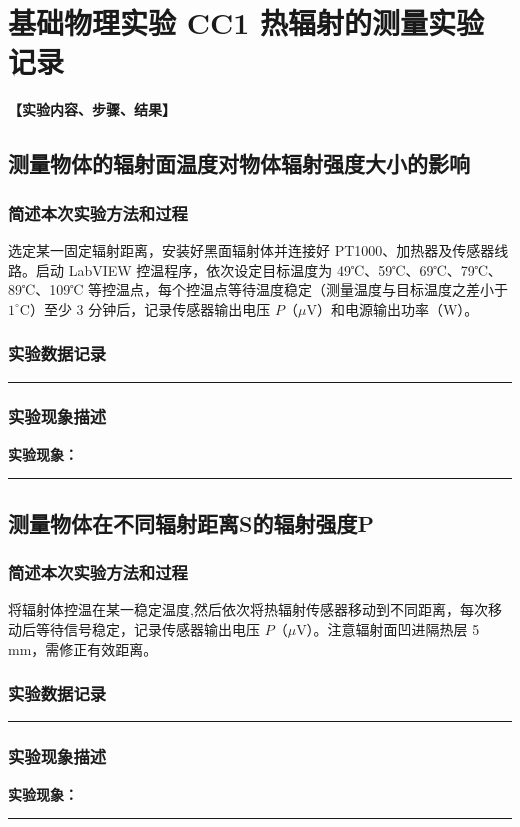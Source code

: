 \documentclass[dvipsnames, svgnames,a4paper,11pt]{article}
\newcommand{\recordblank}[1]{%
  \par\noindent\rule{0.95\linewidth}{0pt}\rule{0pt}{#1}\par}
\begin{document}
\section{基础物理实验  \quad  CC1 热辐射的测量\heiti 实验记录}


\textbf{【实验内容、步骤、结果】}

\subsection{测量物体的辐射面温度对物体辐射强度大小的影响}
\subsubsection{简述本次实验方法和过程}

选定某一固定辐射距离，安装好黑面辐射体并连接好 PT1000、加热器及传感器线路。启动 LabVIEW 控温程序，依次设定目标温度为 49℃、59℃、69℃、79℃、89℃、109℃ 等控温点，每个控温点等待温度稳定（测量温度与目标温度之差小于 $1^\circ\mathrm{C}$）至少 3 分钟后，记录传感器输出电压 $P$（$\mu$V）和电源输出功率（W）。

\subsubsection{实验数据记录}
\recordblank{5.5cm}
\subsubsection{实验现象描述}
\noindent\textbf{实验现象：}\par
\recordblank{4.5cm}
\subsection{测量物体在不同辐射距离S的辐射强度P}
\subsubsection{简述本次实验方法和过程}

将辐射体控温在某一稳定温度,然后依次将热辐射传感器移动到不同距离，每次移动后等待信号稳定，记录传感器输出电压 $P$（$\mu$V）。注意辐射面凹进隔热层 5 mm，需修正有效距离。

\subsubsection{实验数据记录}
\recordblank{5.5cm}
\subsubsection{实验现象描述}
\noindent\textbf{实验现象：}\par
\recordblank{4.5cm}
\end{document}

